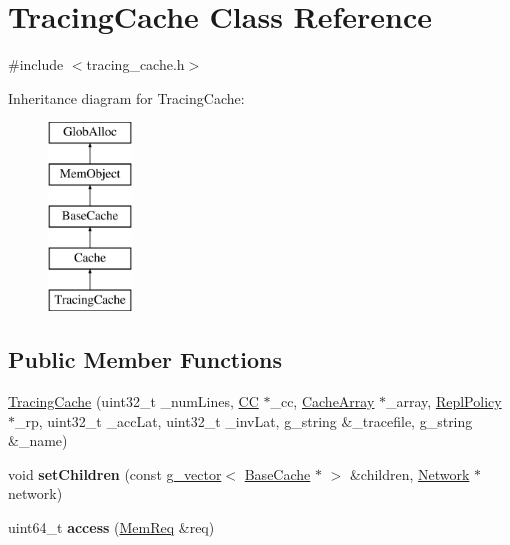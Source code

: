\hypertarget{classTracingCache}{\section{Tracing\-Cache Class Reference}
\label{classTracingCache}
}


{\ttfamily \#include $<$tracing\-\_\-cache.\-h$>$}

Inheritance diagram for Tracing\-Cache\-:\begin{figure}[H]
\begin{center}
\leavevmode
\includegraphics[height=5.000000cm]{classTracingCache}
\end{center}
\end{figure}
\subsection*{Public Member Functions}
\begin{DoxyCompactItemize}
\item 
\hyperlink{classTracingCache_a80a198f4c14fa093580105902b7e677a}{Tracing\-Cache} (uint32\-\_\-t \-\_\-num\-Lines, \hyperlink{classCC}{C\-C} $\ast$\-\_\-cc, \hyperlink{classCacheArray}{Cache\-Array} $\ast$\-\_\-array, \hyperlink{classReplPolicy}{Repl\-Policy} $\ast$\-\_\-rp, uint32\-\_\-t \-\_\-acc\-Lat, uint32\-\_\-t \-\_\-inv\-Lat, g\-\_\-string \&\-\_\-tracefile, g\-\_\-string \&\-\_\-name)
\item 
\hypertarget{classTracingCache_ad0c58f50473ba1563afdffc88362d001}{void {\bfseries set\-Children} (const \hyperlink{classg__vector}{g\-\_\-vector}$<$ \hyperlink{classBaseCache}{Base\-Cache} $\ast$ $>$ \&children, \hyperlink{classNetwork}{Network} $\ast$network)}\label{classTracingCache_ad0c58f50473ba1563afdffc88362d001}

\item 
\hypertarget{classTracingCache_aac8f3a33631138adf7a8008ba6411760}{uint64\-\_\-t {\bfseries access} (\hyperlink{structMemReq}{Mem\-Req} \&req)}\label{classTracingCache_aac8f3a33631138adf7a8008ba6411760}

\end{DoxyCompactItemize}
